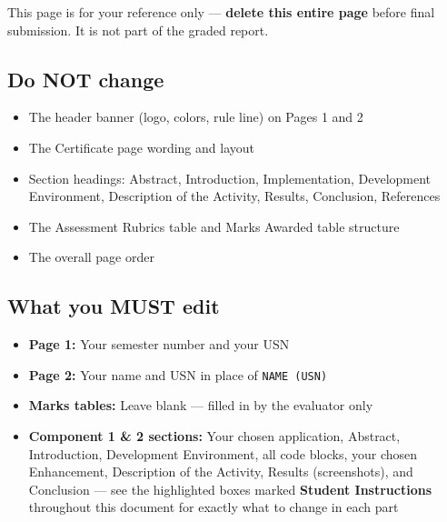 \documentclass[12pt,a4paper]{article}
\begin{document}
\begin{studentnote}
This page is for your reference only --- \textbf{delete this entire page} before final submission. It is not part of the graded report.
\end{studentnote}

\subsection*{Do NOT change}
\begin{itemize}[nosep]
    \item The header banner (logo, colors, rule line) on Pages 1 and 2
    \item The Certificate page wording and layout
    \item Section headings: Abstract, Introduction, Implementation, Development Environment, Description of the Activity, Results, Conclusion, References
    \item The Assessment Rubrics table and Marks Awarded table structure
    \item The overall page order
\end{itemize}

\subsection*{What you MUST edit}
\begin{itemize}[nosep]
    \item \textbf{Page 1:} Your semester number and your USN
    \item \textbf{Page 2:} Your name and USN in place of \texttt{NAME (USN)}
    \item \textbf{Marks tables:} Leave blank --- filled in by the evaluator only
    \item \textbf{Component 1 \& 2 sections:} Your chosen application, Abstract, Introduction, Development Environment, all code blocks, your chosen Enhancement, Description of the Activity, Results (screenshots), and Conclusion --- see the highlighted boxes marked \textcolor{red!60!black}{\bfseries Student Instructions} throughout this document for exactly what to change in each part
\end{itemize}
\end{document}
